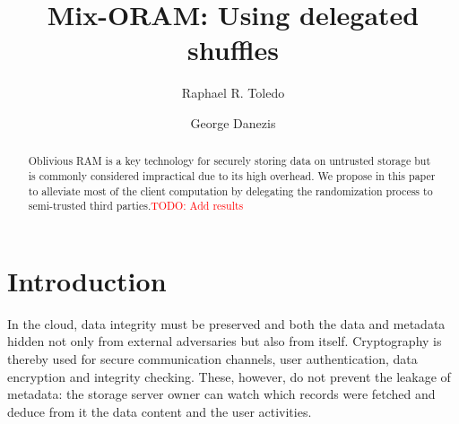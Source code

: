 \documentclass{llncs}
\newcommand{\todo}[1]{\textcolor{red}{TODO: #1}}
\begin{document}
\title{Mix-ORAM: Using delegated shuffles}
%
%
\author{Raphael R. Toledo \and George Danezis}
%
%
%

\maketitle              %

\begin{abstract}
Oblivious RAM is a key technology for securely storing data on untrusted storage but is commonly considered impractical due to its high overhead. We propose in this paper to  alleviate most of the client computation by delegating the randomization process to semi-trusted third parties.\todo{Add results}
\end{abstract}
%
\section{Introduction}\label{Introduction}
%
In the cloud, data integrity must be preserved and both the data and metadata hidden not only from external adversaries but also from itself.
Cryptography is thereby used for secure communication channels, user authentication, data encryption and integrity checking.
These, however, do not prevent the leakage of metadata: the storage server owner can watch which records were fetched and deduce from it the data content and the user activities. 
\end{document}

